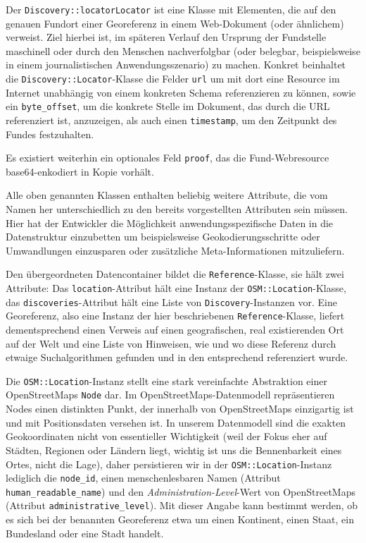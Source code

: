 Der \texttt{Discovery::locatorLocator} ist eine Klasse mit Elementen, die auf den genauen Fundort einer Georeferenz in einem Web-Dokument (oder ähnlichem) verweist. Ziel hierbei ist, im späteren Verlauf den Ursprung der Fundstelle maschinell oder durch den Menschen nachverfolgbar (oder belegbar, beispielsweise in einem journalistischen Anwendungsszenario) zu machen. Konkret beinhaltet die \texttt{Discovery::Locator}-Klasse die Felder \texttt{url} um mit dort eine Resource im Internet unabhängig von einem konkreten Schema referenzieren zu können, sowie ein \texttt{byte\_offset}, um die konkrete Stelle im Dokument, das durch die URL referenziert ist, anzuzeigen, als auch einen \texttt{timestamp}, um den Zeitpunkt des Fundes festzuhalten.
  
Es existiert weiterhin ein optionales Feld \texttt{proof}, das die Fund-Webresource base64-enkodiert in Kopie vorhält.

Alle oben genannten Klassen enthalten beliebig weitere Attribute, die vom Namen her unterschiedlich zu den bereits vorgestellten Attributen sein müssen. Hier hat der Entwickler die Möglichkeit anwendungsspezifische Daten in die Datenstruktur einzubetten um beispielsweise Geokodierungsschritte oder Umwandlungen einzusparen oder zusätzliche Meta-Informationen mitzuliefern.


Den übergeordneten Datencontainer bildet die \texttt{Reference}-Klasse, sie hält zwei Attribute: Das \texttt{location}-Attribut hält eine Instanz der \texttt{OSM::Location}-Klasse, das \texttt{discoveries}-Attribut hält eine Liste von \texttt{Discovery}-Instanzen vor. Eine Georeferenz, also eine Instanz der hier beschriebenen  \texttt{Reference}-Klasse, liefert dementsprechend einen Verweis auf einen geografischen, real existierenden Ort auf der Welt und eine Liste von Hinweisen, wie und wo diese Referenz durch etwaige Suchalgorithmen gefunden und in den entsprechend referenziert wurde.

Die \texttt{OSM::Location}-Instanz stellt eine stark vereinfachte Abstraktion einer OpenStreetMaps \texttt{Node}\cite{OSMnode} dar. Im OpenStreetMaps-Datenmodell repräsentieren Nodes einen distinkten Punkt, der innerhalb von OpenStreetMaps einzigartig ist und mit Positionsdaten versehen ist. In unserem Datenmodell sind die exakten Geokoordinaten nicht von essentieller Wichtigkeit (weil der Fokus eher auf Städten, Regionen oder Ländern liegt, wichtig ist uns die Bennenbarkeit eines Ortes, nicht die Lage), daher persistieren wir in der \texttt{OSM::Location}-Instanz lediglich die \texttt{node\_id}, einen menschenlesbaren Namen (Attribut \texttt{human\_readable\_name}) und den \textit{Administration-Level}-Wert von OpenStreetMaps\cite{OSMadminlevel} (Attribut \texttt{administrative\_level}). Mit dieser Angabe kann bestimmt werden, ob es sich bei der benannten Georeferenz etwa um einen Kontinent, einen Staat, ein Bundesland oder eine Stadt handelt.

